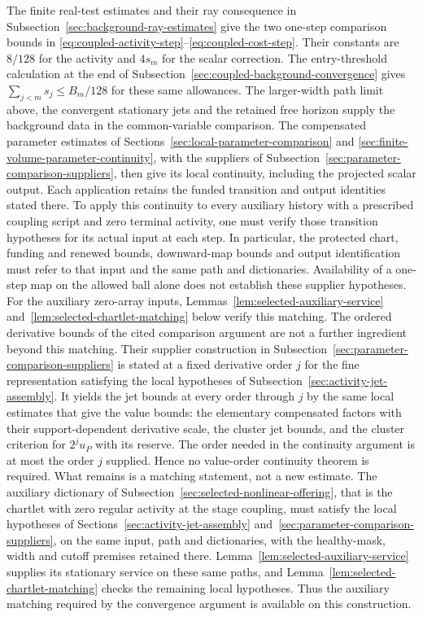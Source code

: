 The finite real-test estimates and their ray consequence in
Subsection~\ref{sec:background-ray-estimates} give the two one-step
comparison bounds in
\eqref{eq:coupled-activity-step}--\eqref{eq:coupled-cost-step}.
Their constants are $8/128$ for the activity and $4s_m$ for the
scalar correction. The entry-threshold calculation at the end of
Subsection~\ref{sec:coupled-background-convergence} gives
$\sum_{j<m}s_j\le B_m/128$ for these same allowances. The
larger-width path limit above, the convergent stationary jets and
the retained free horizon supply the background data in the
common-variable comparison. The compensated parameter estimates
of Sections~\ref{sec:local-parameter-comparison} and
\ref{sec:finite-volume-parameter-continuity}, with the suppliers
of Subsection~\ref{sec:parameter-comparison-suppliers}, then give its
local continuity, including the projected scalar output. Each
application retains the funded transition and output identities
stated there. To apply this continuity to every auxiliary history
with a prescribed coupling script and zero terminal activity, one
must verify those transition hypotheses for its actual input at each
step. In particular, the protected chart, funding and renewed bounds,
downward-map bounds and output identification must refer to that input
and the same path and dictionaries. Availability of a one-step map on
the allowed ball alone does not establish these supplier hypotheses.
For the auxiliary zero-array inputs, Lemmas~\ref{lem:selected-auxiliary-service}
and~\ref{lem:selected-chartlet-matching} below verify this matching.
The ordered derivative bounds of the cited comparison argument are
not a further ingredient beyond this matching. Their supplier
construction in Subsection~\ref{sec:parameter-comparison-suppliers} is
stated at a fixed derivative order $j$ for the fine representation
satisfying the local hypotheses of Subsection~\ref{sec:activity-jet-assembly}.
It yields the jet bounds at every order through $j$ by the same local
estimates that give the value bounds: the elementary compensated
factors with their support-dependent derivative scale, the cluster jet
bounds, and the cluster criterion for $2^ju_P$ with its reserve. The
order needed in the continuity argument is at most the order $j$
supplied. Hence no value-order continuity theorem is required. What
remains is a matching statement, not a new estimate. The auxiliary
dictionary of Subsection~\ref{sec:selected-nonlinear-offering}, that is
the chartlet with zero regular activity at the stage coupling, must
satisfy the local hypotheses of
Sections~\ref{sec:activity-jet-assembly}
and~\ref{sec:parameter-comparison-suppliers}, on the same input, path
and dictionaries, with the healthy-mask, width and cutoff premises
retained there. Lemma~\ref{lem:selected-auxiliary-service} supplies its stationary service
on these same paths, and Lemma~\ref{lem:selected-chartlet-matching}
checks the remaining local hypotheses. Thus the auxiliary matching
required by the convergence argument is available on this construction.

